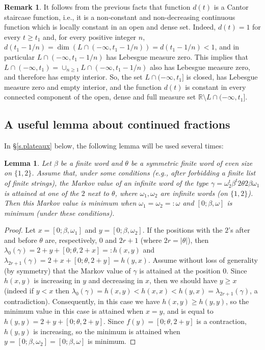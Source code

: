 \documentclass[10pt]{amsart}
\newtheorem{lemma}[theorem]{Lemma}
\numberwithin{equation}{section}
\theoremstyle{definition}
\newtheorem{remark}[theorem]{Remark}
\begin{document}
\begin{remark}
It follows from the previous facts that function $d(t)$ is a Cantor staircase
function, i.e., it is a non-constant and non-decreasing continuous function which is locally
constant in an open and dense set. Indeed, $d(t)=1$ for every $t\ge t_1$ and,
for every positive integer $n$,
$d(t_1-1/n)=\dim(L\cap(-\infty,t_1-1/n))=d(t_1-1/n)<1$, and in particular
$L\cap(-\infty,t_1-1/n)$ has Lebesgue measure zero. This implies that $L\cap
(-\infty,t_1)=\cup_{n\ge 1}L\cap(-\infty,t_1-1/n)$ also has Lebesgue measure
zero, and therefore has empty interior. So, the set $L\cap (-\infty,t_1]$ is
closed, has Lebesgue measure zero and empty interior, and the function $d(t)$ is
constant in every connected component of the open, dense and full measure set
$\mathbb R\setminus L\cap (-\infty,t_1]$. 
\end{remark}
\subsection{A useful lemma about continued fractions} In \S\ref{s.plateaux} below, the following lemma will be used several times:

\begin{lemma}
    \label{l.plateaux} 
    Let $\beta$ be a finite word and $\theta$ be a symmetric finite word of even size on $\{1,2\}$. Assume that, under some conditions (e.g., after forbidding a finite list of finite strings), the Markov value of an infinite word of the type $\gamma=\omega_2^t \beta^t 2\theta 2\beta \omega_1$ is attained at one of the $2$ next to $\theta$, where $\omega_1, \omega_2$ are infinite words (on $\{1,2\}$). Then this Markov value is minimum when $\omega_1=\omega_2=:\omega$ and $[0;\beta,\omega]$ is minimum (under these conditions).
\end{lemma} 

\begin{proof} Let $x=[0;\beta,\omega_1]$ and $y=[0;\beta,\omega_2]$. If the positions with the $2$'s after and before $\theta$ are, respectively, $0$ and $2r+1$ (where $2r=|\theta|$), then $\lambda_0(\gamma)=2+y+[0;\theta,2+x]=:h(x,y)$ and $\lambda_{2r+1}(\gamma)=2+x+[0;\theta,2+y]=h(y,x)$. Assume without loss of generality (by symmetry) that the Markov value of $\gamma$ is attained at the position $0$. Since $h(x,y)$ is increasing in $y$ and decreasing in $x$, then we should have $y\ge x$ (indeed if $y<x$ then $\lambda_0(\gamma)=h(x,y)<h(x,x)<h(y,x)=\lambda_{2r+1}(\gamma)$, a contradiction). 
Consequently, in this case we have $h(x,y)\ge h(y,y)$, so the minimum value in this case is attained when $x=y$, and is equal to $h(y,y)=2+y+[0;\theta,2+y]$. Since $f(y)=[0;\theta,2+y]$ is a contraction, $h(y,y)$ is increasing, so the minimum is attained when $y=[0;\beta,\omega_2]=[0;\beta,\omega]$ is minimum. 
\end{proof} 
\end{document}
